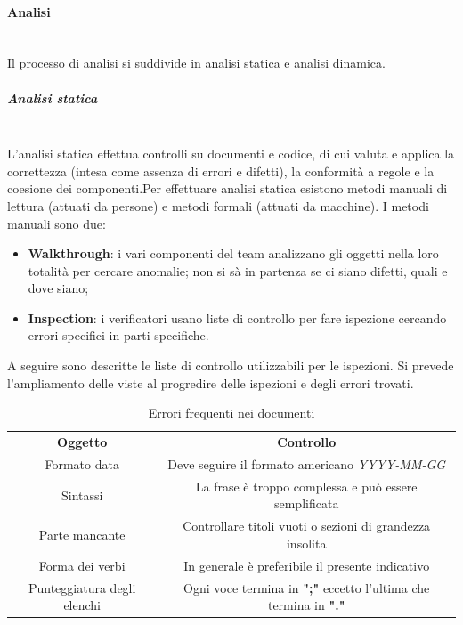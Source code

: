 		\paragraph{Analisi} \mbox{}\\
		Il processo di analisi si suddivide in analisi statica e analisi dinamica.
			\subparagraph{Analisi statica} \mbox{}\\
			L'analisi statica effettua controlli su documenti e codice, di cui valuta e applica la correttezza (intesa come assenza di errori e difetti), la conformità a regole e la coesione dei componenti.\newline Per effettuare analisi statica esistono metodi manuali di lettura (attuati da persone) e metodi formali (attuati da macchine). I metodi manuali sono due:
			\begin{itemize}
				\item \textbf{Walkthrough}: i vari componenti del team analizzano gli oggetti nella loro totalità per cercare anomalie; non si sà in partenza se ci siano difetti, quali e dove siano;
				\item \textbf{Inspection}: i verificatori usano liste di controllo per fare ispezione cercando errori specifici in parti specifiche.
			\end{itemize}
			A seguire sono descritte le liste di controllo utilizzabili per le ispezioni. Si prevede l'ampliamento delle viste al progredire delle ispezioni e degli errori trovati.
			
			
			
			\begin{table}[H]
				\centering\renewcommand{\arraystretch}{1.5}
				\begin{tabular}{c|c}
					
					\rowcolorhead
					{ \textbf{Oggetto}} &
					{ \textbf{Controllo} }\\
					
					\rowcolorlight
					{\colorbody Formato data} & { Deve seguire il formato americano \textit{YYYY-MM-GG}} 
					\\
					
					\rowcolordark
					{\colorbody Sintassi} & {  La frase è troppo complessa e può essere semplificata } 
					\\	
					
					\rowcolorlight
					{\colorbody Parte mancante} & { Controllare titoli vuoti o sezioni di grandezza insolita} 
					\\
					
					\rowcolordark
					{\colorbody Forma dei verbi} & { In generale è preferibile il presente indicativo} 
					\\
					
					\rowcolorlight
					{ Punteggiatura degli elenchi} & { Ogni voce termina in \textbf{";"} eccetto l'ultima che termina in \textbf{"."}} 
					\\
				\end{tabular}
				\caption{Errori frequenti nei documenti}
			\end{table}
			
